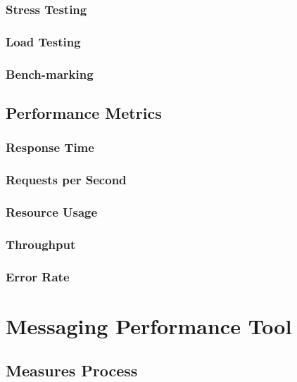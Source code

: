 \subsection*{Stress Testing}

\subsection*{Load Testing}

\subsection*{Bench-marking}

\section{Performance Metrics}
\label{Performance Metrics}

\subsection{Response Time}

\subsection{Requests per Second}

\subsection{Resource Usage}

\subsection{Throughput}

\subsection{Error Rate}

\chapter{Messaging Performance Tool}
\section{Measures Process}

